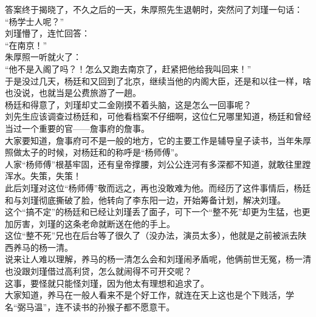 \begin{multicols}{\theparacolNo}
答案终于揭晓了，不久之后的一天，朱厚照先生退朝时，突然问了刘瑾一句话：\\

“杨学士人呢？”\\

刘瑾懵了，连忙回答：\\

“在南京！”\\

朱厚照一听就火了：\\

“他不是入阁了吗？！怎么又跑去南京了，赶紧把他给我叫回来！”\\

于是没过几天，杨廷和又回到了北京，继续当他的内阁大臣，还是和以往一样，啥也没说，也就当是公费旅游了一趟。\\

杨廷和得意了，刘瑾却丈二金刚摸不着头脑，这是怎么一回事呢？\\

刘先生应该调查过杨廷和，可他看档案不仔细啊，这位仁兄哪里知道，杨廷和曾经当过一个重要的官——詹事府的詹事。\\

大家要知道，詹事府可不是一般的地方，它的主要工作是辅导皇子读书，当年朱厚照做太子的时候，对杨廷和的称呼是“杨师傅”。\\

人家“杨师傅”根基牢固，还有皇帝撑腰，刘公公连河有多深都不知道，就敢往里蹚浑水。失策，失策！\\

此后刘瑾对这位“杨师傅”敬而远之，再也没敢难为他。而经历了这件事情后，杨廷和与刘瑾彻底撕破了脸，他转向了李东阳一边，开始筹备计划，解决刘瑾。\\

这个“搞不定”的杨廷和已经让刘瑾丢了面子，可下一个“整不死”却更为生猛，也更加厉害，刘瑾的这条老命就断送在他的手上。\\

这位“整不死”兄也在后台等了很久了（没办法，演员太多），他就是之前被派去陕西养马的杨一清。\\

说来让人难以理解，养马的杨一清怎么会和刘瑾闹矛盾呢，他俩前世无冤，杨一清也没跟刘瑾借过高利贷，怎么就闹得不可开交呢？\\

这事，要怪就只能怪刘瑾，因为他太有理想和追求了。\\

大家知道，养马在一般人看来不是个好工作，就连在天上这也是个下贱活，学名“弼马温”，连不读书的孙猴子都不愿意干。\\


\end{multicols}

